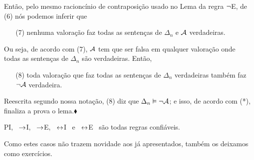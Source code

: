 Então, pelo mesmo racioncínio de contraposição usado no Lema da regra $\neg$E, de (6) nós podemos inferir que
\begin{itemize}
	\item[(7)] nenhuma valoração faz todas as sentenças de $\Delta_n$ e $\mathcal{A}$ verdadeiras.
\end{itemize}
Ou seja, de acordo com (7), $\mathcal{A}$ tem que ser falsa em qualquer valoração onde todas as sentenças de $\Delta_n$ são verdadeiras. Então, 
\begin{itemize}
	\item[(8)] toda valoração que faz todas as sentenças de $\Delta_n$ verdadeiras também faz $\neg\mathcal{A}$ verdadeira.
\end{itemize}
Reescrita segundo nossa notação, (8) diz que $\Delta_n \vDash \neg\mathcal{A}$; e isso, de acordo com (*), finaliza a prova o lema.$\blacklozenge$

%

\begin{factoidboxe}\label{lem:LastRuleSound} PI, \ $\rightarrow$I, \ $\rightarrow$E, \ $\leftrightarrow$I \ e \ $\leftrightarrow$E \ são todas regras confiáveis.
\end{factoidboxe}

Como estes casos não trazem novidade aos já apresentados, também os deixamos como exercícios.

